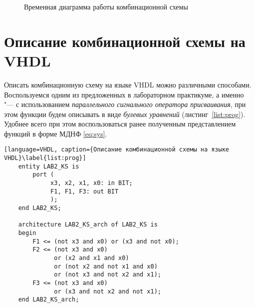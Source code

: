 \begin{figure}
	\rectangle{17cm}{22.5cm}
	\caption{Временная диаграмма работы комбинационной схемы} \label{fig:timeDiagram}
\end{figure}

\section{Описание комбинационной схемы на VHDL}

Описать комбинационную схему на языке VHDL можно различными способами. Воспользуемся одним из предложенных в лабораторном практикуме, а именно "--- с использованием \emph{параллельного сигнального оператора присваивания}, при этом функции будем описывать в виде \emph{булевых уравнений} (листинг~\ref{list:prog}). Удобнее всего при этом воспользоваться ранее полученным представлением функций в форме МДНФ \eqref{eq:sys}.

\begin{lstlisting}[language=VHDL, caption={Описание комбинационной схемы на языке VHDL}\label{list:prog}]
	entity LAB2_KS is
		port (
			 x3, x2, x1, x0: in BIT;
			 F1, F1, F3: out BIT
			 );
	end LAB2_KS;
	
	architecture LAB2_KS_arch of LAB2_KS is
	begin
		F1 <= (not x3 and x0) or (x3 and not x0);
		F2 <= (not x3 and x0)
			  or (x2 and x1 and x0)
			  or (not x2 and not x1 and x0)
			  or (not x3 and not x2 and x1);
		F3 <= (not x3 and x0)
			  or (x3 and not x2 and not x1);
	end LAB2_KS_arch;
\end{lstlisting}

